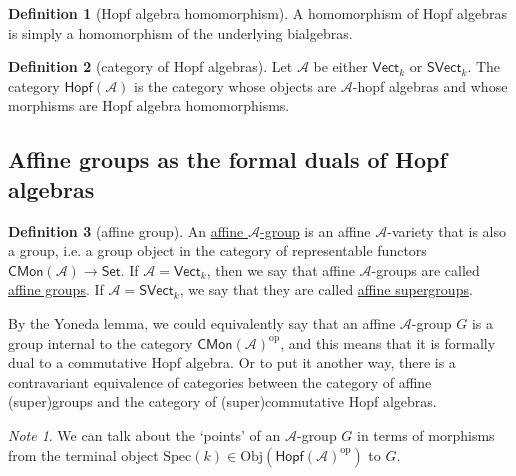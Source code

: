 \documentclass[a4paper,10pt]{scrreprt}
\newcommand{\defn}[1]{\ul{#1}}
\newcommand{\Obj}{\mathrm{Obj}}
\newcommand{\spec}{\mathrm{Spec}}
\theoremstyle{definition}
\newtheorem{definition}{Definition}[section]
\theoremstyle{plain}
\theoremstyle{remark}
\newtheorem{note}{Note}[section]
\begin{document}
\begin{definition}[Hopf algebra homomorphism]
  \label{def:hopfalgebrahomomorphism}
  A homomorphism of Hopf algebras is simply a homomorphism of the underlying bialgebras.
\end{definition}

\begin{definition}[category of Hopf algebras]
  \label{def:categoryofhopfalgebras}
  Let $\mathscr{A}$ be either $\mathsf{Vect}_{k}$ or $\mathsf{SVect}_{k}$. The category $\mathsf{Hopf}(\mathscr{A})$ is the category whose objects are $\mathscr{A}$-hopf algebras and whose morphisms are Hopf algebra homomorphisms.
\end{definition}

\subsection{Affine groups as the formal duals of Hopf algebras}
\begin{definition}[affine group]
  \label{def:affinesuperornotgroup}
  An \defn{affine $\mathscr{A}$-group} is an affine $\mathscr{A}$-variety that is also a group, i.e. a group object in the category of representable functors $\mathsf{CMon}(\mathscr{A}) \to \mathsf{Set}$. If $\mathscr{A} = \mathsf{Vect}_{k}$, then we say that affine $\mathscr{A}$-groups are called \defn{affine groups}. If $\mathscr{A} = \mathsf{SVect}_{k}$, we say that they are called \defn{affine supergroups}.
\end{definition}

By the Yoneda lemma, we could equivalently say that an affine $\mathscr{A}$-group $G$ is a group internal to the category $\mathsf{CMon}(\mathscr{A})^{\mathrm{op}}$, and this means that it is formally dual to a commutative Hopf algebra. Or to put it another way, there is a contravariant equivalence of categories between the category of affine (super)groups and the category of (super)commutative Hopf algebras.

\begin{note}
  We can talk about the `points' of an $\mathscr{A}$-group $G$ in terms of morphisms from the terminal object $\spec(k) \in \Obj(\mathsf{Hopf}(\mathscr{A})^{\mathrm{op}})$ to $G$.
\end{note}
\end{document}
